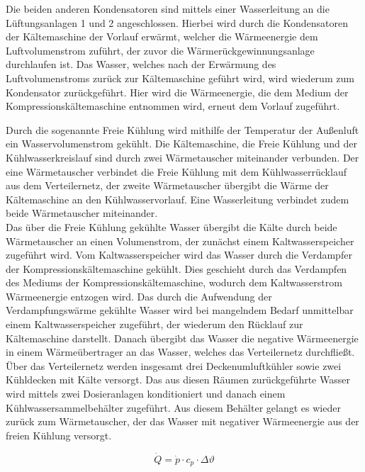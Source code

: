 Die beiden anderen Kondensatoren sind mittels einer Wasserleitung an die Lüftungsanlagen 1 und 2 angeschlossen. Hierbei wird durch die Kondensatoren der Kältemaschine der Vorlauf erwärmt, welcher die Wärmeenergie dem Luftvolumenstrom zuführt, der zuvor die Wärmerückgewinnungsanlage durchlaufen ist. Das Wasser, welches nach der Erwärmung des Luftvolumenstroms zurück zur Kältemaschine geführt wird, wird wiederum zum Kondensator zurückgeführt. Hier wird die Wärmeenergie, die dem Medium der Kompressionskältemaschine entnommen wird, erneut dem Vorlauf zugeführt. 

Durch die sogenannte Freie Kühlung wird mithilfe der Temperatur der Außenluft ein Wasservolumenstrom gekühlt. Die Kältemaschine, die Freie Kühlung und der Kühlwasserkreislauf sind durch zwei Wärmetauscher miteinander verbunden. Der eine Wärmetauscher verbindet die Freie Kühlung mit dem Kühlwasserrücklauf aus dem Verteilernetz, der zweite Wärmetauscher übergibt die Wärme der Kältemaschine an den Kühlwasservorlauf. Eine Wasserleitung verbindet zudem beide Wärmetauscher miteinander. \\ Das über die Freie Kühlung gekühlte Wasser übergibt die Kälte durch beide Wärmetauscher an einen Volumenstrom, der zunächst einem Kaltwasserspeicher zugeführt wird. Vom Kaltwasserspeicher wird das Wasser durch die Verdampfer der Kompressionskältemaschine gekühlt. Dies geschieht durch das Verdampfen des Mediums der Kompressionskältemaschine, wodurch dem Kaltwasserstrom Wärmeenergie entzogen wird. Das durch die Aufwendung der Verdampfungswärme gekühlte Wasser wird bei mangelndem Bedarf unmittelbar einem Kaltwasserspeicher zugeführt, der wiederum den Rücklauf zur Kältemaschine darstellt. Danach übergibt das Wasser die negative Wärmeenergie in einem Wärmeübertrager an das Wasser, welches das Verteilernetz durchfließt. Über das Verteilernetz werden insgesamt drei Deckenumluftkühler sowie zwei Kühldecken mit Kälte versorgt. Das aus diesen Räumen zurückgeführte Wasser wird mittels zwei Dosieranlagen konditioniert und danach einem Kühlwassersammelbehälter zugeführt. Aus diesem Behälter gelangt es wieder zurück zum Wärmetauscher, der das Wasser mit negativer Wärmeenergie aus der freien Kühlung versorgt. 


\begin{equation}
\dot{Q}=\dot{p}\cdot c_p \cdot \Delta \vartheta
\end{equation}




